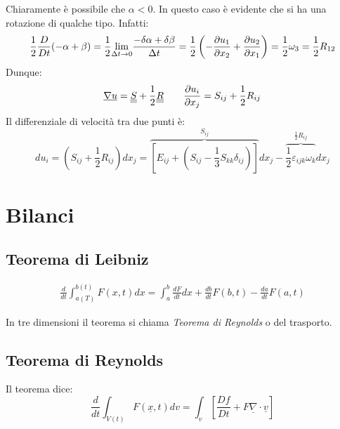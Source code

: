 Chiaramente è possibile che $ \alpha <0 $.
In questo caso è evidente che si ha una rotazione di qualche tipo.
Infatti:
\[
  \frac{1}{2}\frac{D}{Dt}(-\alpha +\beta ) = \frac{1}{2} \displaystyle{\lim_{\Delta t\to0}}\frac{-\delta \alpha +\delta \beta }{\Delta t}= \frac{1}{2}\left(-\frac{\partial u_1}{\partial x_2}+\frac{\partial u_2}{\partial x_1}\right)=\frac{1}{2}\omega_3 = \frac{1}{2}R_{12}
\]
Dunque:
\[
  \underline{\nabla}\underline{u}=\underline{\underline{S}}+\frac{1}{2}\underline{\underline{R}} \qquad \frac{\partial u_i}{\partial x_j}=S_{ij} + \frac{1}{2}R_{ij}
\]
Il differenziale di velocità tra due punti è:
\[
du_i = \left( S_{ij} +\frac{1}{2}R_{ij}\right) dx_j= \overbrace{{\left[ E_{ij} + \left( S_{ij} -\frac{1}{3}S_{kk}\delta_{ij} \right) \right]}}^{S_{ij}} dx_j -\overbrace{{\frac{1}{2}\varepsilon_{ijk} \omega_k}}^{\frac{1}{2}R_{ij}} dx_j
\]

\section{Bilanci}
\subsection*{Teorema di Leibniz}

\begin{gather*}
  \frac{d}{dt} \displaystyle{\int_{a\left( T\right) }^{b\left( t\right) }} F\left( x,t\right) dx
  = \displaystyle{\int_{a}^{b}}\frac{dF}{dt}dx + \frac{db}{dt}F\left( b,t\right) -\frac{da}{dt}F\left( a,t\right) 
\end{gather*}
\begin{figure}[H]
    \centering
    \label{fig:bilanci}
\end{figure}
In tre dimensioni il teorema si chiama \emph{Teorema di Reynolds} o del trasporto.
\subsection{Teorema di Reynolds}
Il teorema dice:
\begin{equation}
  \label{eq:th_reynolds}
  \frac{d}{dt} \displaystyle{\int_{V\left( t\right) }^{}}F\left( \underline{x},t\right) dv=\displaystyle{\int_{v}^{}}\left[ \frac{Df}{Dt} + F \underline{\nabla} \cdot \underline{v}\right] 
\end{equation}


